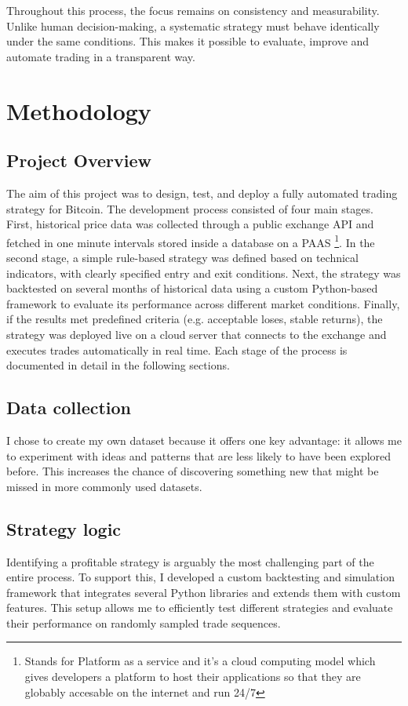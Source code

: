 \documentclass[12pt]{article}
\begin{document}
Throughout this process, the focus remains on consistency and measurability. Unlike human decision-making, a systematic strategy must behave identically under the same conditions. This makes it possible to evaluate, improve and automate trading in a transparent way.



\newpage
\section{Methodology}

\subsection{Project Overview}
The aim of this project was to design, test, and deploy a fully automated trading strategy for Bitcoin. The development process consisted of four main stages. First, historical price data was collected through a public exchange API and fetched in one minute intervals stored inside a database on a PAAS \footnote{Stands for Platform as a service and it's a cloud computing model which gives developers a platform to host their applications so that they are globably accesable on the internet and run 24/7}. In the second stage, a simple rule-based strategy was defined based on technical indicators, with clearly specified entry and exit conditions. Next, the strategy was backtested on several months of historical data using a custom Python-based framework to evaluate its performance across different market conditions. Finally, if the results met predefined criteria (e.g. acceptable loses, stable returns), the strategy was deployed live on a cloud server that connects to the exchange and executes trades automatically in real time. Each stage of the process is documented in detail in the following sections.

\subsection{Data collection}

I chose to create my own dataset because it offers one key advantage: it allows me to experiment with ideas and patterns that are less likely to have been explored before. This increases the chance of discovering something new that might be missed in more commonly used datasets. 


\subsection{Strategy logic}
Identifying a profitable strategy is arguably the most challenging part of the entire process. To support this, I developed a custom backtesting and simulation framework that integrates several Python libraries and extends them with custom features. This setup allows me to efficiently test different strategies and evaluate their performance on randomly sampled trade sequences. 
\end{document}
